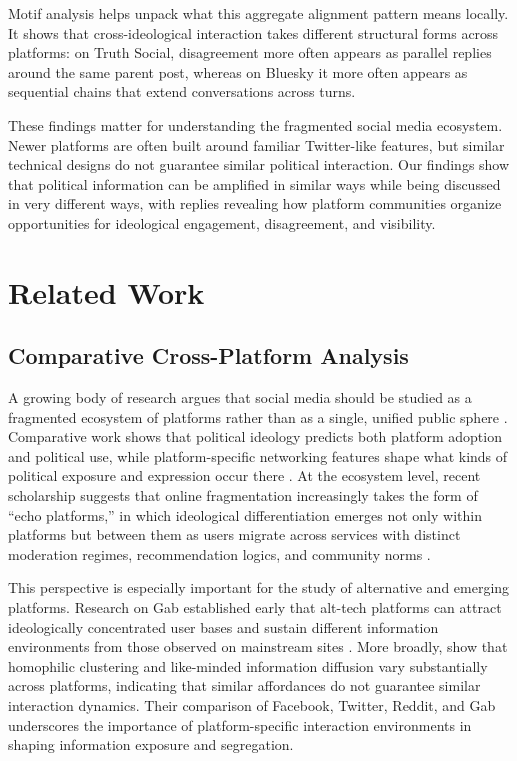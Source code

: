 \documentclass[letterpaper]{article} %
\begin{document}
Motif analysis helps unpack what this aggregate alignment pattern means locally. It shows that cross-ideological interaction takes different structural forms across platforms: on Truth Social, disagreement more often appears as parallel replies around the same parent post, whereas on Bluesky it more often appears as sequential chains that extend conversations across turns.


These findings matter for understanding the fragmented social media ecosystem. Newer platforms are often built around familiar Twitter-like features, but similar technical designs do not guarantee similar political interaction. Our findings show that political information can be amplified in similar ways while being discussed in very different ways, with replies revealing how platform communities organize opportunities for ideological engagement, disagreement, and visibility.

\section{Related Work}

\subsection{Comparative Cross-Platform Analysis}


A growing body of research argues that social media should be studied as a fragmented ecosystem of platforms rather than as a single, unified public sphere \cite{rowe_mining_2014, boulianne_engagement_2023}. Comparative work shows that political ideology predicts both platform adoption and political use, while platform-specific networking features shape what kinds of political exposure and expression occur there \cite{boulianne_social_2025}. At the ecosystem level, recent scholarship suggests that online fragmentation increasingly takes the form of ``echo platforms,'' in which ideological differentiation emerges not only within platforms but between them as users migrate across services with distinct moderation regimes, recommendation logics, and community norms \cite{di_martino_ideological_2025,  mosleh_crossplatform_2025}.

This perspective is especially important for the study of alternative and emerging platforms. Research on Gab established early that alt-tech platforms can attract ideologically concentrated user bases and sustain different information environments from those observed on mainstream sites \cite{zannettou_what_2018}. More broadly, \citet{cinelli_echo_2021} show that homophilic clustering and like-minded information diffusion vary substantially across platforms, indicating that similar affordances do not guarantee similar interaction dynamics. Their comparison of Facebook, Twitter, Reddit, and Gab underscores the importance of platform-specific interaction environments in shaping information exposure and segregation.
\end{document}
